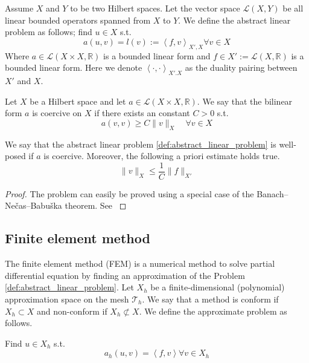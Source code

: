 
\begin{problem}
    \label{def:abstract_linear_problem}
    Assume $X$ and $Y$  to be two Hilbert spaces. Let the vector space $\mathcal{L}( X,Y)  $ be all linear bounded operators spanned from $X$ to $Y$. We define the abstract linear problem as follows; find $u \in X$ s.t. \[
    a( u,v)  = l(v ) := \left<f,v \right>_{X' , X}  \forall v \in X
    \]
    Where $a \in  \mathcal{L} ( X \times X,\mathbb{R} ) $ is a bounded linear form and $f \in X':= \mathcal{L} ( X,\mathbb{R} )  $ is a bounded linear form. Here we denote $\left<\cdot ,\cdot  \right>_{X' .X} $ as the duality pairing between $X' $
    and $X $.

\end{problem}


\begin{definition}[Coercivity]
    \label{def:coercivity}
    Let $X$ be a Hilbert space and let $a \in  \mathcal{L} ( X \times  X,\mathbb{R} )  $. We say that the bilinear form $a$ is coercive on $X$ if there exists an constant $C > 0 $ s.t. \[
     a( v,v) \ge  C \| v \|_{ X }^{  } \quad  \forall v \in  X
    \]
\end{definition}


\begin{lemma}
    \label{def:lax-milgram}
    We say that the abstract linear problem \ref{def:abstract_linear_problem} is well-posed if $a$ is coercive. Moreover, the following a priori estimate holds true.\[
    \| v \|_{ X }^{  } \le \frac{1}{C} \| f \|_{ X'  }^{  }
    \]
\end{lemma}
\begin{proof}
    The problem can easily be proved using a special case of the Banach–Nečas–Babuška theorem. See \cite[Lemma 1.4]{pietro2012}
\end{proof}



\subsection{Finite element method}%
\label{sub:finite_element_method}


The finite element method (FEM) is a numerical method to solve partial differential equation by finding an approximation of the Problem \ref{def:abstract_linear_problem}.  Let $X_{h}$ be a finite-dimensional (polynomial) approximation space on the mesh
$\mathcal{T} _{h}$. We say that a method is conform if $X_{h}\subset X $ and non-conform if $X _{h} \not\subset X$. We define the approximate problem as follows.
\begin{problem}
    \label{def:approx_problem}
    Find  $u \in X_{h}$ s.t. \[
    a_{h}(u,v ) = \left<f,v \right>   \forall v \in X_{h}
    \]
\end{problem}

